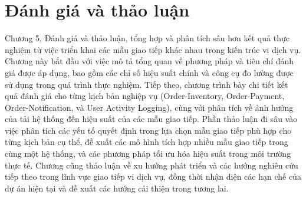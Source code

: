 \chapter{Đánh giá và thảo luận}

Chương 5, Đánh giá và thảo luận, tổng hợp và phân tích sâu hơn kết quả thực nghiệm từ việc triển khai các mẫu giao tiếp khác nhau trong kiến trúc vi dịch vụ. Chương này bắt đầu với việc mô tả tổng quan về phương pháp và tiêu chí đánh giá được áp dụng, bao gồm các chỉ số hiệu suất chính và công cụ đo lường được sử dụng trong quá trình thực nghiệm. Tiếp theo, chương trình bày chi tiết kết quả đánh giá cho từng kịch bản nghiệp vụ (Order-Inventory, Order-Payment, Order-Notification, và User Activity Logging), cùng với phân tích về ảnh hưởng của tải hệ thống đến hiệu suất của các mẫu giao tiếp. Phần thảo luận đi sâu vào việc phân tích các yếu tố quyết định trong lựa chọn mẫu giao tiếp phù hợp cho từng kịch bản cụ thể, đề xuất các mô hình tích hợp nhiều mẫu giao tiếp trong cùng một hệ thống, và các phương pháp tối ưu hóa hiệu suất trong môi trường thực tế. Chương cũng thảo luận về xu hướng phát triển và các hướng nghiên cứu tiếp theo trong lĩnh vực giao tiếp vi dịch vụ, đồng thời nhận diện các hạn chế của dự án hiện tại và đề xuất các hướng cải thiện trong tương lai.











